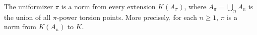 The uniformizer $\pi$ is a norm from every extension $K(A_\pi)$, where $A_\pi = \bigcup_n A_n$ is the union of all $\pi$-power torsion points. More precisely, for each $n \ge 1$, $\pi$ is a norm from $K(A_n)$ to $K$.
